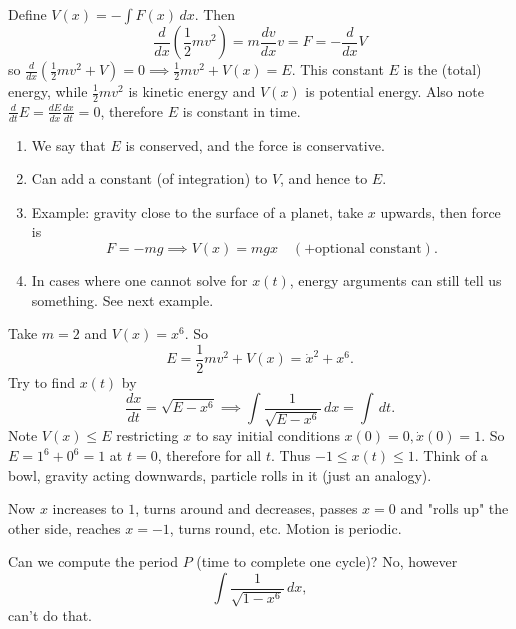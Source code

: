 \documentclass[10pt, a4paper]{article}
\begin{document}
Define $V(x) = -\int F(x)\,dx$.
Then
\[
\frac{d}{dx}\left(\frac{1}{2}mv ^ 2\right) = m\frac{dv}{dx}v = F = -\frac{d}{dx}V
\]
so $\frac{d}{dx}\left(\frac{1}{2}mv ^ 2 + V\right) = 0 \implies \frac{1}{2}mv ^ 2 + V(x) = E$.
This constant $E$ is the
(total)
energy,
while $\frac{1}{2}mv ^ 2$ is kinetic energy and $V(x)$ is potential energy.
Also note $\frac{d}{dt}E = \frac{dE}{dx}\frac{dx}{dt} = 0$,
therefore $E$ is constant in time.
\begin{remark}
    \begin{enumerate}[label = (\roman*)]
        \item We say that $E$ is conserved,
        and the force is conservative.

        \item Can add a constant
        (of integration)
        to $V$,
        and hence to $E$.

        \item Example:
        gravity close to the surface of a planet,
        take $x$ upwards,
        then force is
        \[
        F = -mg \implies V(x) = mgx\quad(+\text{optional constant}).
        \]
        
        \item In cases where one cannot solve for $x(t)$,
        energy arguments can still tell us something.
        See next example.
    \end{enumerate}
\end{remark}

\begin{example}
    Take $m = 2$ and $V(x) = x ^ 6$.
    So
    \[
    E = \frac{1}{2}mv ^ 2 + V(x) = \dot{x} ^ 2 + x ^ 6.
    \]
    Try to find $x(t)$ by
    \[
    \frac{dx}{dt} = \sqrt{E - x ^ 6} \implies \int\frac{1}{\sqrt{E - x ^ 6}}\,dx = \int\,dt.
    \]
    Note $V(x) \leq E$ restricting $x$ to say initial conditions $x(0) = 0, \dot{x}(0) = 1$.
    So $E = 1 ^ 6 + 0 ^ 6 = 1$ at $t = 0$,
    therefore for all $t$.
    Thus $-1 \leq x(t) \leq 1$.
    Think of a bowl,
    gravity acting downwards,
    particle rolls in it
    (just an analogy).

    Now $x$ increases to $1$,
    turns around and decreases,
    passes $x = 0$ and "rolls up" the other side,
    reaches $x = -1$,
    turns round,
    etc.
    Motion is periodic.

    Can we compute the period $P$
    (time to complete one cycle)?
    No,
    however
    \[
    \int\frac{1}{\sqrt{1 - x ^ 6}}\,dx,
    \]
    can't do that.
\end{example}
\end{document}
